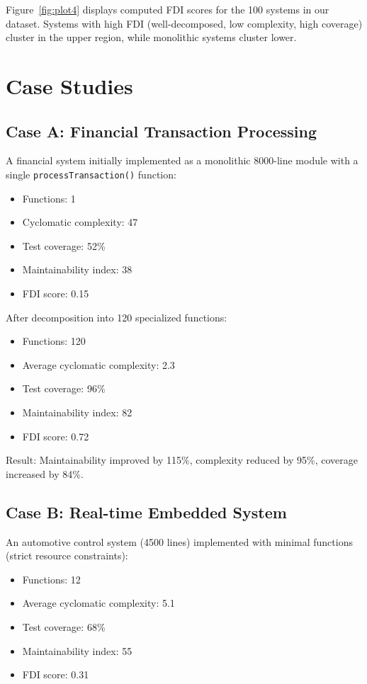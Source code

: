 \documentclass[a4paper,12pt]{article}
\theoremstyle{definition}
\begin{document}
Figure~\ref{fig:plot4} displays computed FDI scores for the 100 systems in our dataset. Systems with high FDI (well-decomposed, low complexity, high coverage) cluster in the upper region, while monolithic systems cluster lower.

\section{Case Studies}

\subsection{Case A: Financial Transaction Processing}

A financial system initially implemented as a monolithic 8000-line module with a single \texttt{processTransaction()} function:

\begin{itemize}
	\item Functions: 1
	\item Cyclomatic complexity: 47
	\item Test coverage: 52\%
	\item Maintainability index: 38
	\item FDI score: 0.15
\end{itemize}

After decomposition into 120 specialized functions:

\begin{itemize}
	\item Functions: 120
	\item Average cyclomatic complexity: 2.3
	\item Test coverage: 96\%
	\item Maintainability index: 82
	\item FDI score: 0.72
\end{itemize}

Result: Maintainability improved by 115\%, complexity reduced by 95\%, coverage increased by 84\%.

\subsection{Case B: Real-time Embedded System}

An automotive control system (4500 lines) implemented with minimal functions (strict resource constraints):

\begin{itemize}
	\item Functions: 12
	\item Average cyclomatic complexity: 5.1
	\item Test coverage: 68\%
	\item Maintainability index: 55
	\item FDI score: 0.31
\end{itemize}
\end{document}
